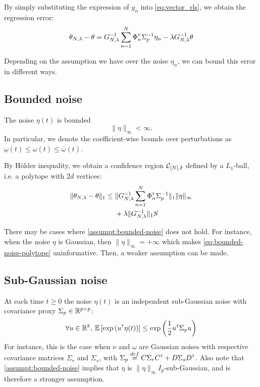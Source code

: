 \documentclass{article}
\begin{document}
By simply substituting the expression of $y_n$ into \eqref{eq:vector_rls}, we obtain the regression error:
\begin{align}
    \theta_{N,\lambda} - \theta = G_{N, \lambda}^{-1}\sum_{n=1}^N \Phi_n^{\mathsf{\scriptscriptstyle T}} \Sigma_p^{-1}\eta_n - \lambda G_{N, \lambda}^{-1}\theta 
\end{align}


Depending on the assumption we have over the noise $\eta_n$, we can bound this error in different ways.


\subsection{Bounded noise}

\begin{assumption}
\label{assumpt:bounded-noise}
The noise $\eta(t)$ is bounded
\[
\|\eta\|_\infty < \infty.
\]
In particular, we denote the coefficient-wise bounds over perturbations as $\underline{\omega}(t) \leq \omega(t) \leq \overline{\omega}(t)$.
\end{assumption}

By Hölder inequality, we obtain a confidence region $\mathcal{C}_{[N],\delta}$ defined by a $L_1$-ball, i.e. a polytope with $2d$ vertices:
\begin{equation}
\begin{split}
\label{eq:bounded-noise-polytope}
\|\theta_{N,\lambda} - \theta\|_1 \leq {} &\|G_{N, \lambda}^{-1}\sum_{n=1}^N \Phi_n^{\mathsf{\scriptscriptstyle T}} \Sigma_p^{-1}\|_1\|\eta\|_\infty \\
&+ \lambda\|G_{N, \lambda}^{-1}\|_1 S
\end{split}
\end{equation}

There may be cases where \autoref{assumpt:bounded-noise} does not hold. For instance, when the noise $\eta$ is Gaussian, then $\|\eta\|_\infty=+\infty$ which makes \eqref{eq:bounded-noise-polytope} uninformative. Then, a weaker assumption can be made.

\subsection{Sub-Gaussian noise}

\begin{assumption}
\label{assumpt:gaussian-noise}
At each time $t\geq0$ the noise $\eta(t)$ is an independent sub-Gaussian noise with covariance proxy $\Sigma_p \in \mathbb{R}^{p\times p}$:
\begin{equation*}
    \forall u\in\mathbb{R}^k,\, \operatorname*{\mathbb{E}} \left[ \exp{\left( u^{\mathsf{\scriptscriptstyle T}}\eta(t)\right)}\right] \leq \exp{\left( \frac{1}{2} u^{\mathsf{\scriptscriptstyle T}}\Sigma_p u\right)}
\end{equation*}
For instance, this is the case when $\nu$ and $\omega$ are Gaussian noises with respective covariance matrices $\Sigma_r$ and $\Sigma_s$, with $\Sigma_p \stackrel{def}{=} C\Sigma_r C^{\mathsf{\scriptscriptstyle T}} + D\Sigma_s D^{\mathsf{\scriptscriptstyle T}}$. Also note that \autoref{assumpt:bounded-noise} implies that $\eta$ is $\|\eta\|_\infty I_p$-sub-Gaussian, and is therefore a stronger assumption.
\end{assumption}
\end{document}

